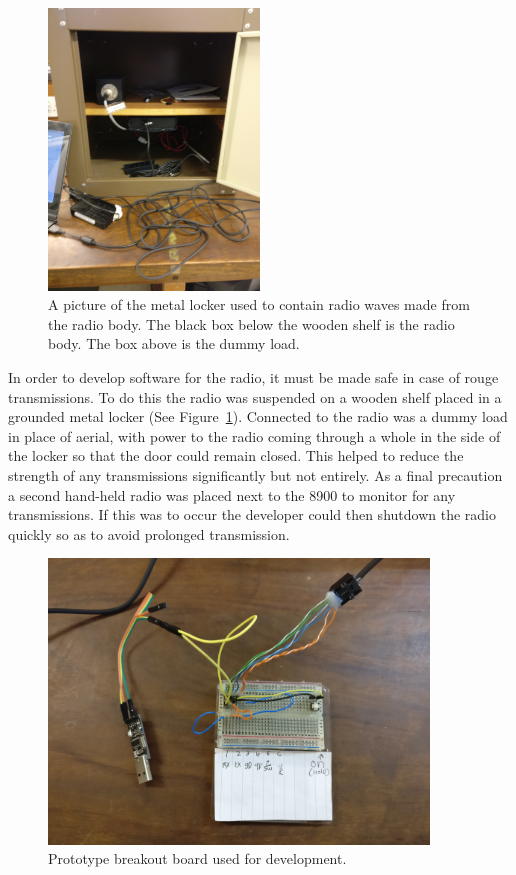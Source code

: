 \begin{figure}
    \centering
    \includegraphics[width=0.5\textwidth]{img/locker.jpg}
    \caption[Radio locker]{A picture of the metal locker used to contain radio waves made from the radio body. The black box below the wooden shelf is the radio body. The box above is the dummy load.}
    \label{fig:locker}
\end{figure}

In order to develop software for the radio, it must be made safe in case of rouge transmissions. To do this the radio was suspended on a wooden shelf placed in a grounded metal locker (See Figure~\ref{fig:locker}). Connected to the radio was a dummy load in place of aerial, with power to the radio coming through a whole in the side of the locker so that the door could remain closed. This helped to reduce the strength of any transmissions significantly but not entirely. As a final precaution a second hand-held radio was placed next to the \gls{8900} to monitor for any transmissions. If this was to occur the developer could then shutdown the radio quickly so as to avoid prolonged transmission.

\begin{figure}
    \centering
    \includegraphics[width=0.9\textwidth]{img/bread_board}
    \caption[Prototype breakout board]{Prototype breakout board used for development.}
    \label{fig:brake_out_board}
\end{figure}

